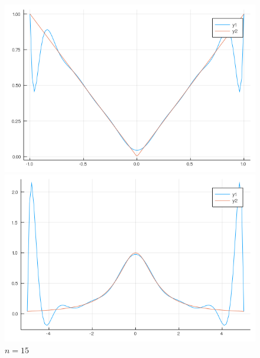 \documentclass[11pt, a4paper]{article}
\begin{document}
\begin{figure}[H]
        \begin{minipage}{0.5\textwidth}
            \caption{$n=15$}
            \centering
            \includegraphics[width=\linewidth]{plot-6_a_n15}
        \end{minipage}
        \begin{minipage}{0.5\textwidth}
            \caption{$n=15$}
            \centering
            \includegraphics[width=\linewidth]{plot-6_b_n15}
        \end{minipage}
    \end{figure}
\end{document}
